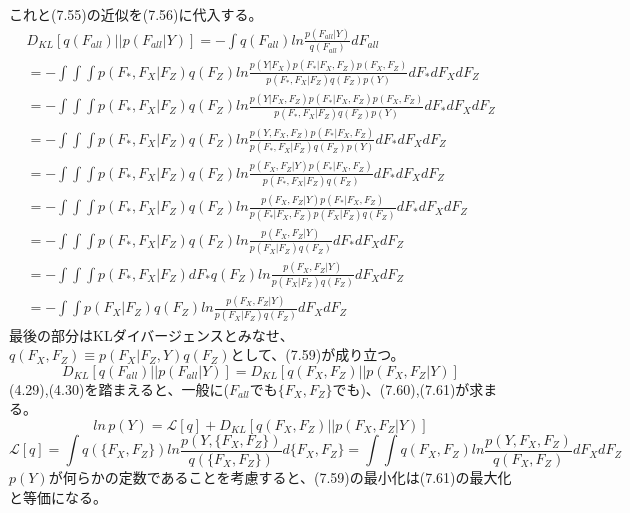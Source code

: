 \documentclass{jsarticle}
\begin{document}
これと(7.55)の近似を(7.56)に代入する。
\begin{equation}
\begin{split}
D_{KL}[ q(F_{all}) || p(F_{all} | Y) ] = -\int q(F_{all}) ln \frac{p(F_{all} | Y)}{q(F_{all})} dF_{all}\\
=-\int \int \int p(F_*, F_X | F_Z) q(F_Z) ln \frac{p(Y | F_X) p(F_* | F_X, F_Z) p(F_X, F_Z)}{p(F_*, F_X | F_Z) q(F_Z) p(Y)} dF_* dF_X dF_Z\\
=-\int \int \int p(F_*, F_X | F_Z) q(F_Z) ln \frac{p(Y | F_X, F_Z) p(F_* | F_X, F_Z) p(F_X, F_Z)}{p(F_*, F_X | F_Z) q(F_Z) p(Y)} dF_* dF_X dF_Z\\
=-\int \int \int p(F_*, F_X | F_Z) q(F_Z) ln \frac{p(Y, F_X, F_Z) p(F_* | F_X, F_Z)}{p(F_*, F_X | F_Z) q(F_Z) p(Y)} dF_* dF_X dF_Z\\
=-\int \int \int p(F_*, F_X | F_Z) q(F_Z) ln \frac{p(F_X, F_Z | Y) p(F_* | F_X, F_Z)}{p(F_*, F_X | F_Z) q(F_Z)} dF_* dF_X dF_Z\\
=-\int \int \int p(F_*, F_X | F_Z) q(F_Z) ln \frac{p(F_X, F_Z | Y) p(F_* | F_X, F_Z)}{p(F_* | F_X, F_Z)p(F_X | F_Z) q(F_Z)} dF_* dF_X dF_Z\\
=-\int \int \int p(F_*, F_X | F_Z) q(F_Z) ln \frac{p(F_X, F_Z | Y)}{p(F_X | F_Z) q(F_Z)} dF_* dF_X dF_Z\\
=-\int \int \int p(F_*, F_X | F_Z) dF_* q(F_Z) ln \frac{p(F_X, F_Z | Y)}{p(F_X | F_Z) q(F_Z)} dF_X dF_Z\\
=-\int \int p(F_X | F_Z) q(F_Z) ln \frac{p(F_X, F_Z | Y)}{p(F_X | F_Z) q(F_Z)} dF_X dF_Z
\end{split}
\end{equation}
最後の部分はKLダイバージェンスとみなせ、$q(F_X, F_Z) \equiv p(F_X | F_Z , Y)q(F_Z)$として、(7.59)が成り立つ。
\begin{equation}
D_{KL}[ q(F_{all}) || p(F_{all} | Y) ] = D_{KL}[ q(F_X, F_Z) || p(F_X, F_Z | Y) ]
\end{equation}
(4.29),(4.30)を踏まえると、一般に($F_{all}$でも$\{F_X, F_Z \}$でも)、(7.60),(7.61)が求まる。
\begin{equation}
ln \, p(Y) = \mathcal{L}[q] + D_{KL}[q(F_X, F_Z) || p(F_X, F_Z | Y)]
\end{equation}
\begin{equation}
\mathcal{L}[q] = \int q(\{ F_X, F_Z\}) ln \frac{p(Y, \{ F_X, F_Z\})}{q(\{ F_X, F_Z\})} d\{ F_X, F_Z\} = \int \int q(F_X, F_Z) ln \frac{p(Y, F_X, F_Z)}{q(F_X, F_Z)} dF_X dF_Z
\end{equation}
$p(Y)$が何らかの定数であることを考慮すると、(7.59)の最小化は(7.61)の最大化と等価になる。
\end{document}
